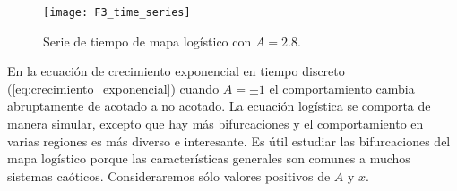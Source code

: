         \begin{figure}[hbtp]
            \caption{Serie de tiempo de mapa logístico con $A = 2.8$.}
            \centering
            \texttt{[image: F3\_time\_series]}
            \label{fig:F3_time_series}
        \end{figure}

        En la ecuación de crecimiento exponencial en tiempo discreto (\ref{eq:crecimiento_exponencial}) cuando $A = \pm 1$ el comportamiento cambia abruptamente de acotado a no acotado. La ecuación logística se comporta de manera simular, excepto que hay más bifurcaciones y el comportamiento en varias regiones es más diverso e interesante. Es útil estudiar las bifurcaciones del mapa logístico porque las características generales son comunes a muchos sistemas caóticos. Consideraremos sólo valores positivos de $A$ y $x$.

